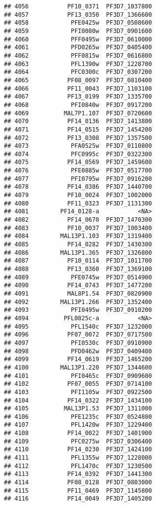 \documentclass[12pt, a4paper]{article}\usepackage[]{graphicx}\usepackage[]{color}
\makeatletter
\newenvironment{kframe}{%
 \def\at@end@of@kframe{}%
 \ifinner\ifhmode%
  \def\at@end@of@kframe{\end{minipage}}%
  \begin{minipage}{\columnwidth}%
 \fi\fi%
 \def\FrameCommand##1{\hskip\@totalleftmargin \hskip-\fboxsep
 \colorbox{shadecolor}{##1}\hskip-\fboxsep
     \hskip-\linewidth \hskip-\@totalleftmargin \hskip\columnwidth}%
 \MakeFramed {\advance\hsize-\width
   \@totalleftmargin\z@ \linewidth\hsize
   \@setminipage}}%
 {\par\unskip\endMakeFramed%
 \at@end@of@kframe}
\newenvironment{knitrout}{}{} %
\makeatother
\begin{document}
\begin{knitrout}
\begin{kframe}
\begin{verbatim}
## 4056           PF10_0371  PF3D7_1037800
## 4057           PF13_0350  PF3D7_1366600
## 4058            PFE0425w  PF3D7_0508600
## 4059            PFI0080w  PF3D7_0901600
## 4060            PFF0495w  PF3D7_0610000
## 4061            PFD0265w  PF3D7_0405400
## 4062            PFF0815w  PF3D7_0616800
## 4063            PFL1390w  PF3D7_1228700
## 4064            PFC0300c  PF3D7_0307200
## 4065           PF08_0097  PF3D7_0810400
## 4066           PF11_0043  PF3D7_1103100
## 4067           PF13_0199  PF3D7_1335700
## 4068            PFI0840w  PF3D7_0917200
## 4069          MAL7P1.107  PF3D7_0720600
## 4070           PF14_0136  PF3D7_1413800
## 4071           PF14_0515  PF3D7_1454200
## 4072           PF13_0308  PF3D7_1357500
## 4073            PFA0525w  PF3D7_0110800
## 4074            PFC0995c  PF3D7_0322300
## 4075           PF14_0569  PF3D7_1459600
## 4076            PFE0885w  PF3D7_0517700
## 4077            PFI0795w  PF3D7_0916200
## 4078           PF14_0386  PF3D7_1440700
## 4079           PF10_0024  PF3D7_1002000
## 4080           PF11_0323  PF3D7_1131300
## 4081         PF14_0128-a           <NA>
## 4082           PF14_0670  PF3D7_1470300
## 4083           PF10_0037  PF3D7_1003400
## 4084         MAL13P1.103  PF3D7_1319400
## 4085           PF14_0282  PF3D7_1430300
## 4086         MAL13P1.365  PF3D7_1326800
## 4087           PF10_0114  PF3D7_1011700
## 4088           PF13_0360  PF3D7_1369100
## 4089            PFE0745w  PF3D7_0514900
## 4090           PF14_0743  PF3D7_1477200
## 4091           MAL8P1.54  PF3D7_0820900
## 4092         MAL13P1.266  PF3D7_1352400
## 4093            PFI0495w  PF3D7_0910200
## 4094          PFL0825c-a           <NA>
## 4095            PFL1540c  PF3D7_1232000
## 4096           PF07_0072  PF3D7_0717500
## 4097            PFI0530c  PF3D7_0910900
## 4098            PFD0462w  PF3D7_0409400
## 4099           PF14_0619  PF3D7_1465200
## 4100         MAL13P1.220  PF3D7_1344600
## 4101            PFI0465c  PF3D7_0909600
## 4102           PF07_0055  PF3D7_0714100
## 4103            PFI1105w  PF3D7_0922500
## 4104           PF14_0322  PF3D7_1434100
## 4105          MAL13P1.53  PF3D7_1311000
## 4106            PFE1235c  PF3D7_0524800
## 4107            PFL1420w  PF3D7_1229400
## 4108           PF14_0022  PF3D7_1401900
## 4109            PFC0275w  PF3D7_0306400
## 4110           PF14_0230  PF3D7_1424100
## 4111            PFL1355w  PF3D7_1228000
## 4112            PFL1470c  PF3D7_1230500
## 4113           PF14_0392  PF3D7_1441300
## 4114           PF08_0128  PF3D7_0803000
## 4115           PF11_0469  PF3D7_1145800
## 4116           PF14_0049  PF3D7_1405200

\end{verbatim}
\end{kframe}
\end{knitrout}
\end{document}
